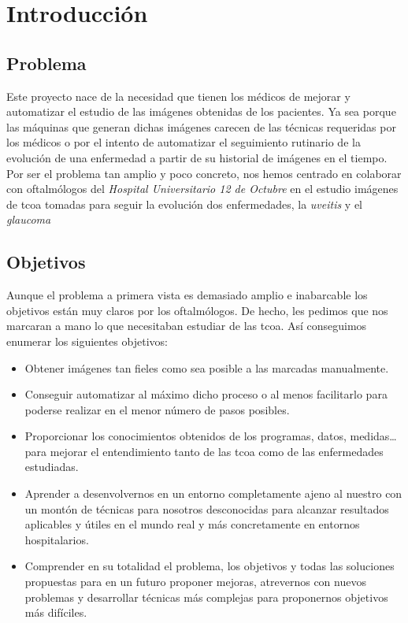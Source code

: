 \chapter{Introducción}
\section{Problema}
Este proyecto nace de la necesidad que tienen los médicos de mejorar y
automatizar el estudio de las imágenes obtenidas de los pacientes. Ya
sea porque las máquinas que generan dichas imágenes carecen de las
técnicas requeridas por los médicos o por el intento de automatizar el
seguimiento rutinario de la evolución de una enfermedad a partir de su
historial de imágenes en el tiempo. \\
Por ser el problema tan amplio y poco concreto, nos hemos
centrado en colaborar con oftalmólogos del \emph{Hospital
  Universitario 12 de Octubre} en el estudio imágenes de \gls{tcoa}
tomadas para seguir la evolución dos enfermedades, la \emph{uveitis} y el \emph{glaucoma}

\section{Objetivos}
Aunque el problema a primera vista es demasiado amplio e inabarcable
los objetivos están muy claros por los oftalmólogos. De hecho, les
pedimos que nos marcaran a mano lo que necesitaban estudiar de las
\gls{tcoa}. Así conseguimos enumerar los siguientes objetivos:
\begin{itemize}
\item Obtener imágenes tan fieles como sea posible a las marcadas
  manualmente.
\item Conseguir automatizar al máximo dicho proceso o al menos
  facilitarlo para poderse realizar en el menor número de pasos posibles.
\item Proporcionar los conocimientos obtenidos de los programas, datos,
  medidas\ldots para mejorar el entendimiento tanto de las \gls{tcoa}
  como de las enfermedades estudiadas.
\item Aprender a desenvolvernos en un entorno completamente ajeno al
  nuestro con un montón de técnicas para nosotros desconocidas para alcanzar
  resultados aplicables y útiles en el  mundo real y más concretamente
  en entornos hospitalarios.
\item Comprender en su totalidad el problema, los objetivos y todas
  las soluciones propuestas para en un futuro proponer mejoras,
  atrevernos con nuevos problemas y desarrollar técnicas más complejas
  para proponernos objetivos más difíciles.
\end{itemize}
